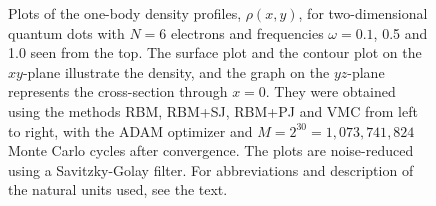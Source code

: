 \begin{landscape}
\begin{figure} [H]
		\caption{Plots of the one-body density profiles, $\rho(x,y)$, for two-dimensional quantum dots with $N=6$ electrons and frequencies $\omega=0.1$, 0.5 and 1.0 seen from the top. The surface plot and the contour plot on the $xy$-plane illustrate the density, and the graph on the $yz$-plane represents the cross-section through $x=0$. They were obtained using the methods RBM, RBM+SJ, RBM+PJ and VMC from left to right, with the ADAM optimizer and $M=2^{30}=1,073,741,824$ Monte Carlo cycles after convergence. The plots are noise-reduced using a Savitzky-Golay filter. For abbreviations and description of the natural units used, see the text.}%
		\label{fig:OB2_interaction_6P}
	\end{figure}
	\begin{figure} [H]%
		\centering
		\captionsetup[subfigure]{labelformat=empty}
		\captionsetup{width=0.9\hsize}
		\hspace{0.1cm}
		\hspace{-0.0cm}
		\hspace{-0.0cm}
		\hspace{-0.0cm}

\end{figure}
\end{landscape}
